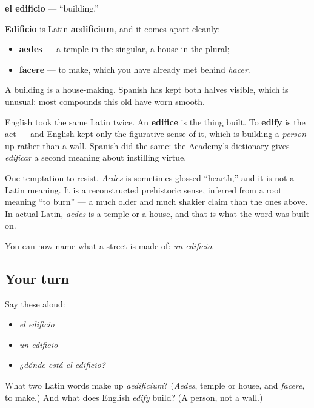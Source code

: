\begin{cousinweb}
\textbf{el edificio} — \textquotedblleft{}building.\textquotedblright{}

\textbf{Edificio} is Latin \textbf{aedificium}, and it comes apart cleanly:

\begin{itemize}
\raggedright
  \item \textbf{aedes} — a temple in the singular, a house in the plural;
  \item \textbf{facere} — to make, which you have already met behind \emph{hacer}.
\end{itemize}

A building is a house-making. Spanish has kept both halves visible, which is unusual: most compounds this old have worn smooth.

English took the same Latin twice. An \textbf{edifice} is the thing built. To \textbf{edify} is the act — and English kept only the figurative sense of it, which is building a \emph{person} up rather than a wall. Spanish did the same: the Academy's dictionary gives \emph{edificar} a second meaning about instilling virtue.

One temptation to resist. \emph{Aedes} is sometimes glossed \textquotedblleft{}hearth,\textquotedblright{} and it is not a Latin meaning. It is a reconstructed prehistoric sense, inferred from a root meaning \textquotedblleft{}to burn\textquotedblright{} — a much older and much shakier claim than the ones above. In actual Latin, \emph{aedes} is a temple or a house, and that is what the word was built on.
\end{cousinweb}

\begin{grammarlens}[title={What you've built}]
You can now name what a street is made of: \emph{un edificio}.
\end{grammarlens}

\subsection*{Your turn}
Say these aloud:

\begin{itemize}
\raggedright
  \item \emph{el edificio}
  \item \emph{un edificio}
  \item \emph{¿dónde está el edificio?}
\end{itemize}

\begin{tcolorbox}[breakable,colback=teal!4,colframe=teal!35!black,title={Before you move on}]
What two Latin words make up \emph{aedificium}? (\emph{Aedes}, temple or house, and \emph{facere}, to make.) And what does English \emph{edify} build? (A person, not a wall.)
\end{tcolorbox}
